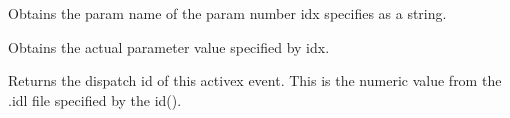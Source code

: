 \label{wxactivexeventparamname}


Obtains the param name of the param number idx specifies as a string.


\label{wxactivexeventoparray}


Obtains the actual parameter value specified by idx.


\label{wxactivexeventgetdispatchid}


Returns the dispatch id of this activex event. This is the numeric value from
the .idl file specified by the id().

